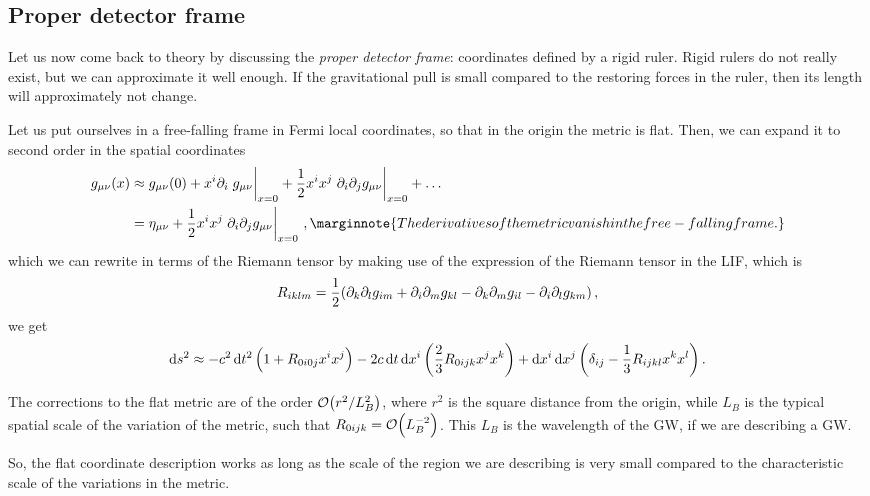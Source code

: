 \documentclass[main.tex]{subfiles}
\begin{document}
\subsection{Proper detector frame}

Let us now come back to theory by discussing the \emph{proper detector frame}: coordinates defined by a rigid ruler. 
Rigid rulers do not really exist, but we can approximate it well enough. If the gravitational pull is small compared to the restoring forces in the ruler, then its length will approximately not change. 

Let us put ourselves in a free-falling frame in Fermi local coordinates, so that in the origin the metric is flat.
Then, we can expand it to second order in the spatial coordinates 
%
\begin{subequations}
\begin{align}
g_{\mu \nu } (x) &\approx g_{\mu \nu } (0)
+ x^{i} \partial_{i} \eval{g_{\mu \nu }}_{x=0} 
+ \frac{1}{2} x^{i} x^{j} \eval{\partial_{i} \partial_{j} g_{\mu \nu }}_{x=0} + \dots  \\
&= \eta_{\mu \nu } + \frac{1}{2} x^{i} x^{j} \eval{\partial_{i} \partial_{j} g_{\mu \nu }}_{x=0}
\,, \marginnote{The derivatives of the metric vanish in the free-falling frame.}
\end{align}
\end{subequations}
%
which we can rewrite in terms of the Riemann tensor by making use of the expression of the Riemann tensor in the LIF, which is 
%
\begin{align} \label{eq:riemann-tensor-LIF}
R_{iklm} = \frac{1}{2} \qty(
  \partial_{k} \partial_{l} g_{im} +
  \partial_{i} \partial_{m} g_{kl} -
  \partial_{k} \partial_{m} g_{il} -
  \partial_{i} \partial_{l} g_{km}  
)
\,,
\end{align}
%
we get 
%
\begin{align}
\dd{s^2} \approx - c^2 \dd{t^2} \qty(1 + R_{0i0j} x^{i}x^{j})
-2 c \dd{t} \dd{x^{i}} \qty(\frac{2}{3}R_{0ijk} x^{j}x^{k})
+ \dd{x^{i}} \dd{x^{j}} \qty(\delta_{ij} - \frac{1}{3} R_{ijkl} x^{k} x^{l})
\,.
\end{align}

The corrections to the flat metric are of the order \(\order{r^2 / L_B^2}\), where \(r^2\) is the square distance from the origin, while \(L_B\) is the typical spatial scale of the variation of the metric, such that \(R_{0ijk} = \order{L_B^{-2}}\). 
This \(L_B\) is the wavelength of the GW, if we are describing a GW.

So, the flat coordinate description works as long as the scale of the region we are describing is very small compared to the characteristic scale of the variations in the metric. 
\end{document}
